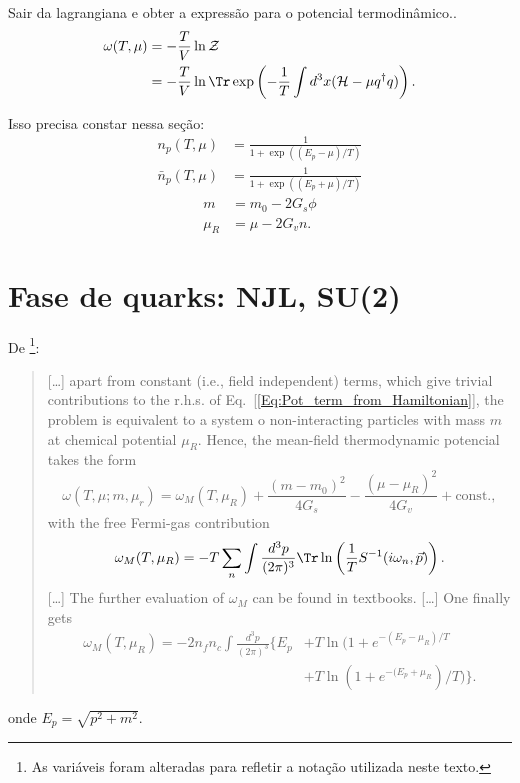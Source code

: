 Sair da lagrangiana e obter a expressão para o potencial termodinâmico.\parencite{Asakawa1989}.
\begin{align}
	\omega(T, \mu) &= -\frac{T}{V} \ln\mathcal{Z} \\
	&= -\frac{T}{V} \ln\Tr\exp\left(-\frac{1}{T} \int d^3 x(\mathcal{H} - \mu q^\dagger q)\right). \label{Eq:Pot_term_from_Hamiltonian}
\end{align}

Isso precisa constar nessa seção:
\begin{align}
	n_p(T, \mu) &= \frac{1}{1+\exp((E_p - \mu)/T)} \\
	\bar{n}_p(T, \mu) &= \frac{1}{1 + \exp((E_p + \mu)/T)}
\end{align}
\begin{align}\label{Eq:Def_m_mu_r}
	m &= m_0 - 2 G_s \phi \\
	\mu_R &= \mu - 2 G_v n.
\end{align}

\section{Fase de quarks: NJL, SU(2)}

De \textcite{Buballa}\footnote{As variáveis foram alteradas para refletir a notação utilizada neste texto.}:
\begin{quote}
	[\dots] apart from constant (i.e., field independent) terms, which give trivial contributions to the r.h.s. of Eq.~[\eqref{Eq:Pot_term_from_Hamiltonian}], the problem is equivalent to a system o non-interacting particles with mass $m$ at chemical potential $\mu_R$. Hence, the mean-field thermodynamic potencial takes the form
	\begin{equation}\label{Eq:Pot_Termo_Temp_Finita}
		\omega(T, \mu; m, \mu_r) = \omega_M(T, \mu_R) + \frac{(m - m_0)^2}{4G_s} - \frac{(\mu - \mu_R)^2}{4G_v} + \textrm{const.},
	\end{equation}
	with the free Fermi-gas contribution
	\begin{equation}
		\omega_M(T, \mu_R) = -T \sum_n \int \frac{d^3p}{(2\pi)^3} \Tr\ln\left(\frac{1}{T}S^{-1}(i\omega_n,\vec{p})\right).
	\end{equation}
	[\dots]
	The further evaluation of $\omega_M$ can be found in textbooks. [\dots] One finally gets
	\begin{equation}
	\begin{split}\label{Eq:Por_Termo_Temp_Finita_Fermi_Gas_Contrib}
		\omega_M(T, \mu_R) = -2 n_f n_c \int \frac{d^3p}{(2\pi)^3} \{E_p &+ T\ln(1+e^{-(E_p-\mu_R)/T} \\
		&+ T\ln(1 + e^{-(E_p+\mu_R})/T)\}.
	\end{split}
	\end{equation}
\end{quote}
%
onde $E_p = \sqrt{p^2 + m^2}$.

